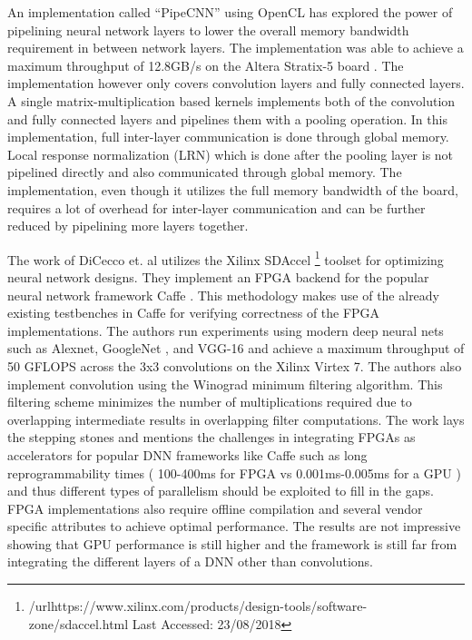 An implementation called “PipeCNN” \cite{pipecnn} using OpenCL has explored the power of pipelining neural network layers to lower the overall memory bandwidth requirement in between network layers. The implementation was able to achieve a maximum throughput of 12.8GB/s on the Altera Stratix-5 board \cite{pipecnn}. The implementation however only covers convolution layers and fully connected layers. A single matrix-multiplication based kernels implements both of the convolution and fully connected layers and pipelines them with a pooling operation. In this implementation, full inter-layer communication is done through global memory. Local response normalization (LRN) which is done after the pooling layer is not pipelined directly and also communicated through global memory. The implementation, even though it utilizes the full memory bandwidth of the board, requires a lot of overhead for inter-layer communication and can be further reduced by pipelining more layers together.

The work of DiCecco et. al \cite{caffeinated} utilizes the Xilinx SDAccel \footnote{/url{https://www.xilinx.com/products/design-tools/software-zone/sdaccel.html} Last Accessed: 23/08/2018 } toolset for optimizing neural network designs. They implement an FPGA backend for the popular neural network framework Caffe \cite{caffe}. This methodology makes use of the already existing testbenches in Caffe for verifying correctness of the FPGA implementations. The authors run experiments using modern deep neural nets such as Alexnet\cite{alexnet}, GoogleNet \cite{szegedy2015going}, and VGG-16\cite{simonyan2014very} and achieve a maximum throughput of 50 GFLOPS across the 3x3 convolutions on the Xilinx Virtex 7. The authors also implement convolution using the Winograd \cite{lavin2016fast} minimum filtering algorithm. This filtering scheme minimizes the number of multiplications required due to overlapping intermediate results in overlapping filter computations. The work lays the stepping stones and mentions the challenges in integrating FPGAs as accelerators for popular DNN frameworks like Caffe such as long reprogrammability times ( 100-400ms for FPGA vs 0.001ms-0.005ms for a GPU ) and thus different types of parallelism should be exploited to fill in the gaps. FPGA implementations also require offline compilation and several vendor specific attributes to achieve optimal performance. The results are not impressive showing that GPU performance is still higher and the framework is still far from integrating the different layers of a DNN other than convolutions.

